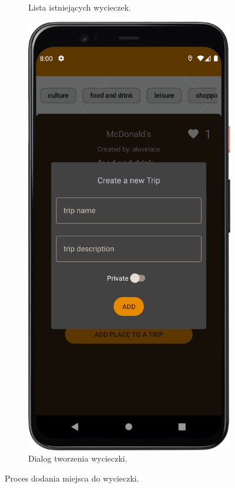 \begin{figure}[H]
\begin{subfigure}[b]{0.3\textwidth}
                \caption{Lista istniejących wycieczek.\label{trip_exist}}
            \end{subfigure}
            \hfill
            \begin{subfigure}[b]{0.3\textwidth}
                \centering
                \includegraphics[width=\textwidth]{src/app/new_trip.png}
                \caption{Dialog tworzenia wycieczki.\label{trip_new}}
            \end{subfigure}
            \caption{Proces dodania miejsca do wycieczki.\label{trip}}
            \qquad
        \end{figure} 
        \vspace{1cm}


